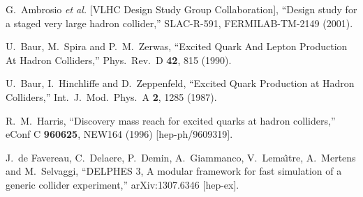 \begin{thebibliography}{99}

  G.~Ambrosio {\it et al.}  [VLHC Design Study Group Collaboration],
  ``Design study for a staged very large hadron collider,''
  SLAC-R-591, FERMILAB-TM-2149 (2001).

  U.~Baur, M.~Spira and P.~M.~Zerwas,
  ``Excited Quark And Lepton Production At Hadron Colliders,''
  Phys.\ Rev.\ D {\bf 42}, 815 (1990).

  U.~Baur, I.~Hinchliffe and D.~Zeppenfeld,
  ``Excited Quark Production at Hadron Colliders,''
  Int.\ J.\ Mod.\ Phys.\ A {\bf 2}, 1285 (1987).

  R.~M.~Harris,
  ``Discovery mass reach for excited quarks at hadron colliders,''
  eConf C {\bf 960625}, NEW164 (1996)
  [hep-ph/9609319].

  J.~de Favereau, C.~Delaere, P.~Demin, A.~Giammanco, V.~Lema\^{\i}tre, A.~Mertens and M.~Selvaggi,
  ``DELPHES 3, A modular framework for fast simulation of a generic collider experiment,''
  arXiv:1307.6346 [hep-ex].

\end{thebibliography}


